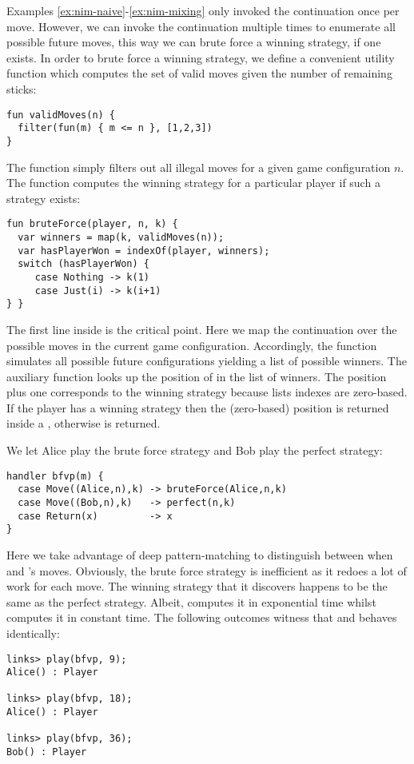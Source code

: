 \begin{example}\label{ex:nim-brute-force}
Examples \ref{ex:nim-naive}-\ref{ex:nim-mixing} only invoked the continuation once per move. However, we can invoke the continuation multiple times to enumerate all possible future moves, this way we can brute force a winning strategy, if one exists. In order to brute force a winning strategy, we define a convenient utility function which computes the set of valid moves given the number of remaining sticks:
\begin{lstlisting}[style=links]
fun validMoves(n) {
  filter(fun(m) { m <= n }, [1,2,3])
}
\end{lstlisting}
The function simply filters out all illegal moves for a given game configuration $n$.
The function  computes the winning strategy for a particular player if such a strategy exists:
\begin{lstlisting}[style=links]
fun bruteForce(player, n, k) {
  var winners = map(k, validMoves(n));
  var hasPlayerWon = indexOf(player, winners);
  switch (hasPlayerWon) {
     case Nothing -> k(1)
     case Just(i) -> k(i+1)
} }
\end{lstlisting}
The first line inside  is the critical point. Here we map the continuation  over the possible moves in the current game configuration. Accordingly, the function simulates all possible future configurations yielding a list of possible winners. The auxiliary function  looks up the position of  in the list of winners. The position plus one corresponds to the winning strategy because lists indexes are zero-based. If the player has a winning strategy then the (zero-based) position is returned inside a , otherwise  is returned.

We let Alice play the brute force strategy and Bob play the perfect strategy:
\begin{lstlisting}[style=links]
handler bfvp(m) {
  case Move((Alice,n),k) -> bruteForce(Alice,n,k)
  case Move((Bob,n),k)   -> perfect(n,k)
  case Return(x)         -> x
}
\end{lstlisting}
Here we take advantage of deep pattern-matching to distinguish between when  and 's moves. Obviously, the brute force strategy is inefficient as it redoes a lot of work for each move. The winning strategy that it discovers happens to be the same as the perfect strategy. Albeit,  computes it in exponential time whilst  computes it in constant time. The following outcomes witness that  and  behaves identically:
\begin{lstlisting}[style=links]
links> play(bfvp, 9);
Alice() : Player

links> play(bfvp, 18);
Alice() : Player

links> play(bfvp, 36);
Bob() : Player
\end{lstlisting}
\end{example}
